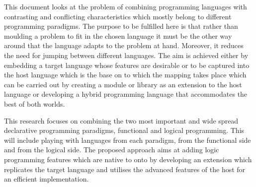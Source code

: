 \begin{unbcabstract}
\begin{comment}
\par Programming has become an integral part of working and interacting with computers and day by day more and more complex problems are solved using the power of programming. It is possibly the only way to talk to computers and hence the need for a robust and multi purpose programming language has never been more urgent. In the last few years or nearly a decade, the Declarative Style of programming has gained popularity in being more suited for solving problems and also in the way it has easily adapted to a number of domains. Declarative Programming Languages have not only challenged but has also proved as a better more richer alternative than the conventional Procedural Imperative Object Oriented way of doing things. The methodologies that have stood out are the Functional and Logical Approaches. The former based on Functions and Lambda Calculus while the latter on Horn Clause Logic. With each of them having their own advantages and flaws, one has to make a choice or may be not? This document looks at the 
attempts, improvements and future possibilities of bringing Haskell, a Purely Functional Programming Language and Prolog, a Logical Programming Language, one step closer to avail a mixed bag of a rich feature set.    
\end{comment}

This document looks at the problem of combining programming languages with contrasting and conflicting 
characteristics which mostly belong to different pro\-gram\-ming pa\-ra\-digms. The purpose to be fulfilled here is that 
rather than moulding a problem to fit in the chosen language it must be the other way around that the language 
adapts to the problem at hand. Moreover, it reduces the need for jumping between different  languages. The aim is 
achieved either by embedding a target language  whose features are desirable or to be captured into the host 
language which is the base on to which the mapping takes place which can be carried out by creating a module or 
library as an extension to the host language or developing a hybrid programming language that accommodates the 
best of both worlds.  

This research focuses on combining the two most important and wide spread declarative programming paradigms, 
functional and logical programming. This will include playing with languages from each paradigm, 
 from the functional side and  from the logical side. The proposed approach 
aims at adding logic programming features which are native to  onto  by 
developing an extension which replicates the target language and utilises the advanced features of the host for an 
efficient implementation.      


\end{unbcabstract}

